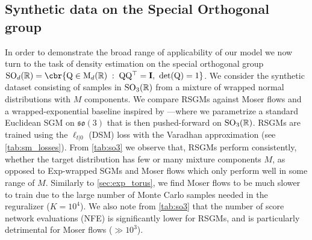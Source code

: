 \subsection{Synthetic data on the Special Orthogonal group}
\label{sec:exp_so3}
In order to demonstrate the broad range of applicability of our model we now turn to the task of density estimation on the special orthogonal group $\mathrm{SO}_d(\R) = \cbr{\mathrm{Q} \in \mathrm{M}_d(\R) \;:\;\mathrm{Q} \mathrm{Q}^\top = \m{I}, \ \det(\mathrm{Q})=1}$.
We consider the synthetic dataset consisting of samples in $\mathrm{SO}_3(\mathbb{R})$ from a mixture of wrapped normal distributions with $M$ components.
We compare RSGMs against Moser flows and a wrapped-exponential baseline inspired by \textcite{falorsi2019reparameterizing}---where we parametrize a standard Euclidean SGM on $\mathfrak{so}(3)$ that is then pushed-forward on $\mathrm{SO}_3(\mathbb{R})$.
RSGMs are trained using the $\ell_{t|0}$ (DSM) loss with the Varadhan approximation (see \cref{tab:sm_losses}).
From \cref{tab:so3} we observe that, RSGMs perform consistently, whether the target distribution has few or many mixture components $M$, as opposed to Exp-wrapped SGMs and Moser flows which only perform well in some range of $M$.
Similarly to \cref{sec:exp_torus}, we find Moser flows to be much slower to train due to the large number of Monte Carlo samples needed in the reguralizer ($K=10^4$).
We also note from \cref{tab:so3} that the number of score network evaluations (NFE) is significantly lower for RSGMs, and is particularly detrimental for Moser flows ($\gg 10^3$).


